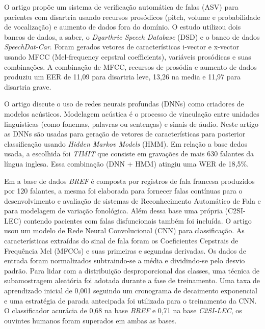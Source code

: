 \documentclass[a4paper,12pt,openright,oneside]{book}
\newenvironment{myenv}[1]
  {\begin{spacing}{#1}}
  {\end{spacing}}
\begin{document}
\begin{myenv}{1.5}
				\par O artigo \cite{salim2023automatic} propõe um sistema de verificação automática de falas (ASV) para pacientes com disartria usando recursos prosódicos (pitch, volume e probabilidade de vocalização) e aumento de dados fora do domínio. O estudo utilizou dois bancos de dados, a saber, o \textit{Dyarthric Speech Database} (DSD) e o banco de dados \textit{SpeechDat-Car}. Foram gerados vetores de características i-vector e x-vector usando MFCC (Mel-frequency cepstral coefficients), variáveis prosódicas e suas combinações. A combinação de MFCC, recursos de prosódia e aumento de dados produziu um EER de 11,09 para disartria leve, 13,26 na media e 11,97 para disartria grave.\newline
	
				\par O artigo \cite{6296526} discute o uso de redes neurais profundas (DNNs) como criadores de modelos acústicos. Modelagem acústica é o processo de vinculação entre unidades linguísticas (como fonemas, palavras ou sentenças) e sinais de áudio. Neste artigo as DNNs são usadas para geração de vetores de características para posterior classificação usando \textit{Hidden Markov Models} (HMM). Em relação a base dedos usada, a escolhida foi \textit{TIMIT} que consiste em gravações de mais 630 falantes da língua inglesa. Essa combinação (DNN + HMM) atingiu uma WER de 18,5\%.\newline
				
				\par Em \cite{abderrazek20_interspeech} a base de dados \textit{BREF} é composta por registros de fala francesa produzidos por 120 falantes, a mesma foi elaborada para fornecer falas contínuas para o desenvolvimento e avaliação de sistemas de Reconhecimento Automático de Fala e para modelagem de variação fonológica. Além dessa base uma própria (C2SI-LEC) contendo pacientes com falas disfuncionais também foi incluída. O artigo usou um modelo de Rede Neural Convolucional (CNN) para classificação. As características extraídas do sinal de fala foram os Coeficientes Cepstrais de Frequência Mel (MFCCs) e suas primeiras e segundas derivadas. Os dados de entrada foram normalizados subtraindo-se a média e dividindo-se pelo desvio padrão. Para lidar com a distribuição desproporcional das classes, uma técnica de subamostragem aleatória foi adotada durante a fase de treinamento. Uma taxa de aprendizado inicial de 0,001 seguindo um cronograma de decaimento exponencial e uma estratégia de parada antecipada foi utilizada para o treinamento da CNN. O classificador acurácia de 0,68 na base \textit{BREF} e 0,71 na base \textit{C2SI-LEC}, os ouvintes humanos foram superados em ambas as bases.\newline
				

\end{myenv}
\end{document}
